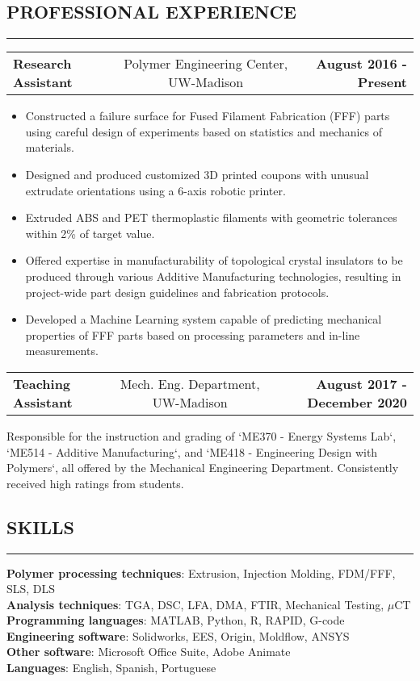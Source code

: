 \documentclass[11pt,letterpaper]{article}
\makeatletter
\newcommand{\headerrow}[3]
{\vspace{0.4em}
\noindent
\begin{tabular*}{\textwidth}{l @{\extracolsep{\fill}} cr}
	\textbf{#1} & %
	#2 &		  %
	\textbf{#3}\\ %
\end{tabular*}}
\makeatother
\begin{document}
\subsection*{PROFESSIONAL EXPERIENCE}
	\vspace{-0.5em}
	\hrule

	\headerrow
		{Research Assistant}
		{Polymer Engineering Center, UW-Madison}
		{August 2016 - Present}
		
	\begin{itemize}
		
		\item Constructed a failure surface for Fused Filament Fabrication (FFF) parts using careful design of experiments based on statistics and mechanics of materials.
		\item Designed and produced customized 3D printed coupons with unusual extrudate orientations using a 6-axis robotic printer.
		\item Extruded ABS and PET thermoplastic filaments with geometric tolerances within 2\% of target value. 
		\item Offered expertise in manufacturability of topological crystal insulators to be produced through various Additive Manufacturing technologies, resulting in project-wide part design guidelines and fabrication protocols. 
		\item Developed a Machine Learning system capable of predicting mechanical properties of FFF parts based on processing parameters and in-line measurements.

	\end{itemize}

	\headerrow
	{Teaching Assistant}
	{Mech. Eng. Department, UW-Madison} 
	{August 2017 - December 2020}
	Responsible for the instruction and grading of `ME370 - Energy Systems Lab`, `ME514 - Additive Manufacturing`, and `ME418 - Engineering Design with Polymers`, all offered by the Mechanical Engineering Department. Consistently received high ratings from students.

\subsection*{SKILLS}
\vspace{-0.5em}
\hrule
\vspace{0.4em}

\textbf{Polymer processing techniques}: Extrusion, Injection Molding, FDM/FFF, SLS, DLS\\
\textbf{Analysis techniques}: TGA, DSC, LFA, DMA, FTIR, Mechanical Testing, $\mu$CT\\
\textbf{Programming languages}: MATLAB, Python, R, RAPID, G-code\\
\textbf{Engineering software}: Solidworks, EES, Origin, Moldflow, ANSYS\\
\textbf{Other software}: Microsoft Office Suite, Adobe Animate\\
\textbf{Languages}: English, Spanish, Portuguese\\
\end{document}
